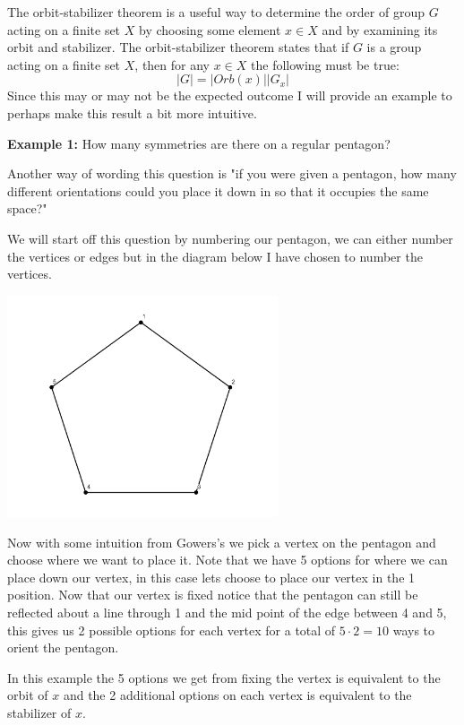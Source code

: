 \documentclass[../main.tex]{subfiles}
\begin{document}
The orbit-stabilizer theorem is a useful way to determine the order of group $G$ acting on a finite set $X$ by choosing some element $x \in X$ and by examining its orbit and stabilizer. The orbit-stabilizer theorem states that if $G$ is a group acting on a finite set $X$, then for any $x \in X$ the following must be true:
\begin{equation*}
\lvert G \rvert = \lvert Orb(x) \rvert \lvert G_x \rvert
\end{equation*}
Since this may or may not be the expected outcome I will provide an example to perhaps make this result a bit more intuitive.

\textbf{Example 1:} How many symmetries are there on a regular pentagon?

Another way of wording this question is "if you were given a pentagon, how many different orientations could you place it down in so that it occupies the same space?"

We will start off this question by numbering our pentagon, we can either number the vertices or edges but in the diagram below I have chosen to number the vertices.

\begin{center}
\includegraphics[width=80mm]{images/pentagon.png}
\end{center}

Now with some intuition from Gowers's \cite{gowers} we pick a vertex on the pentagon and choose where we want to place it. Note that we have 5 options for where we can place down our vertex, in this case lets choose to place our vertex  in the 1 position. Now that our vertex is fixed notice that the pentagon can still be reflected about a line through 1 and the mid point of the edge between 4 and 5, this gives us 2 possible options for each vertex for a total of $5 \cdot 2 = 10$ ways to orient the pentagon.

In this example the 5 options we get from fixing the vertex is equivalent to the orbit of $x$ and the 2 additional options on each vertex is equivalent to the stabilizer of $x$.
\end{document}
